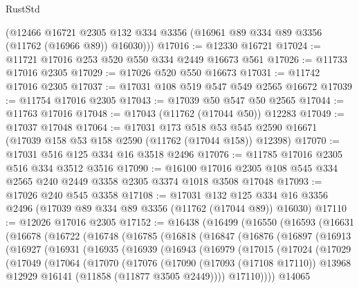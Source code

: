 \begin{lexlean}{RustStd}
\begin{coremodule}
      (@12466
        @16721
        @2305
        @132
        @334
        @3356
        (@16961 @89 @334 @89 @3356 (@11762 (@16966 @89)) @16030)))
@17016 := @12330 @16721
@17024 := @11721 @17016 @253 @520 @550 @334 @2449 @16673 @561
@17026 := @11733 @17016 @2305
@17029 := @17026 @520 @550 @16673
@17031 := @11742 @17016 @2305
@17037 := @17031 @108 @519 @547 @549 @2565 @16672
@17039 := @11754 @17016 @2305
@17043 := @17039 @50 @547 @50 @2565
@17044 := @11763 @17016
@17048 := @17043 (@11762 (@17044 @50)) @12283
@17049 := @17037 @17048
@17064 := @17031
    @173
    @518
    @53
    @545
    @2590
    @16671
    (@17039 @158 @53 @158 @2590 (@11762 (@17044 @158)) @12398)
@17070 := @17031 @516 @125 @334 @16 @3518 @2496
@17076 := @11785 @17016 @2305 @516 @334 @3512 @3516
@17090 := @16100 @17016 @2305 @108 @545 @334 @2565 @240 @2449 @3358 @2305 @3374 @1018 @3508 @17048
@17093 := @17026 @240 @545 @3358
@17108 := @17031
    @132
    @125
    @334
    @16
    @3356
    @2496
    (@17039 @89 @334 @89 @3356 (@11762 (@17044 @89)) @16030)
@17110 := @12026 @17016 @2305
@17152 := @16438
    (@16499
      (@16550
        (@16593
          (@16631
            (@16678
              (@16722
                (@16748
                  (@16785
                    (@16818
                      (@16847
                        (@16876
                          (@16897
                            (@16913
                              (@16927
                                (@16931
                                  (@16935
                                    (@16939
                                      (@16943
                                        (@16979
                                          (@17015
                                            (@17024
                                              (@17029
                                                (@17049
                                                  (@17064
                                                    (@17070
                                                      (@17076
                                                        (@17090
                                                          (@17093 (@17108 @17110))
                                                          @13968
                                                          @12929
                                                          @16141
                                                          (@11858 (@11877 @3505 @2449))))
                                                      @17110))))
                                              @14065

\end{coremodule}
\end{lexlean}
